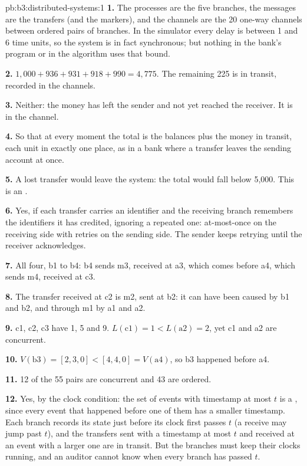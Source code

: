 \begin{solution}{pb:b3:distributed-systems:1}
\textbf{1.} The processes are the five branches, the messages are the transfers (and the markers), and the channels are the 20 one-way channels between ordered pairs of branches. In the simulator every delay is between 1 and 6 time units, so the system is in fact synchronous; but nothing in the bank's program or in the algorithm uses that bound.

\textbf{2.} $1{,}000 + 936 + 931 + 918 + 990 = 4{,}775$. The remaining 225 is in transit, recorded in the channels.

\textbf{3.} Neither: the money has left the sender and not yet reached the receiver. It is in the channel.

\textbf{4.} So that at every moment the total is the balances plus the money in transit, each unit in exactly one place, as in a bank where a transfer leaves the sending account at once.

\textbf{5.} A lost transfer would leave the system: the total would fall below 5,000. This is an .

\textbf{6.} Yes, if each transfer carries an identifier and the receiving branch remembers the identifiers it has credited, ignoring a repeated one: at-most-once on the receiving side with retries on the sending side. The sender keeps retrying until the receiver acknowledges.

\textbf{7.} All four, b1 to b4: b4 sends m3, received at a3, which comes before a4, which sends m4, received at c3.

\textbf{8.} The transfer received at c2 is m2, sent at b2: it can have been caused by b1 and b2, and through m1 by a1 and a2.

\textbf{9.} c1, c2, c3 have 1, 5 and 9. $L(\mathrm{c1}) = 1 < L(\mathrm{a2}) = 2$, yet c1 and a2 are concurrent.

\textbf{10.} $V(\mathrm{b3}) = [2, 3, 0] < [4, 4, 0] = V(\mathrm{a4})$, so b3 happened before a4.

\textbf{11.} 12 of the 55 pairs are concurrent and 43 are ordered.

\textbf{12.} Yes, by the clock condition: the set of events with timestamp at most $t$ is a , since every event that happened before one of them has a smaller timestamp. Each branch records its state just before its clock first passes $t$ (a receive may jump past $t$), and the transfers sent with a timestamp at most $t$ and received at an event with a larger one are in transit. But the branches must keep their clocks running, and an auditor cannot know when every branch has passed $t$.


\end{solution}
